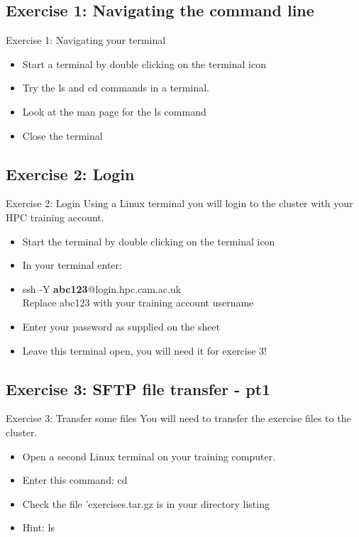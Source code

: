 \subsection{Exercise 1: Navigating the command line}
\begin{frame}{Exercise 1: Navigating your terminal}
\begin{itemize}
\item{Start a terminal by double clicking on the terminal icon}
\item{Try the \alert{\footnotesize ls } and \alert{\footnotesize cd } commands in a terminal.}
\item{Look at the man page for the ls command}
\item{Close the terminal}
\end{itemize}
\end{frame}

\subsection{Exercise 2: Login}
\begin{frame}{Exercise 2: Login}
Using a Linux terminal you will login to the cluster with your HPC training account.
\begin{itemize}
\item{Start the terminal by double clicking on the terminal icon}
\item In your terminal enter:
\item{ssh -Y \textbf{abc123}@login.hpc.cam.ac.uk}\\
Replace abc123 with your training account username 
\item {Enter your password as supplied on the sheet}
\item{Leave this terminal open, you will need it for exercise 3!}
\end{itemize}
\end{frame}

\subsection{Exercise 3: SFTP file transfer - pt1}
\begin{frame}{Exercise 3: Transfer some files}
You will need to transfer the exercise files to the cluster.
\begin{itemize}
\item{Open a second Linux terminal on your training computer.}
\item{Enter this command: cd \alert{\footnotesize {}}}
\item{Check the file 'exercises.tar.gz is in your directory listing}
\item{Hint: ls}
\end{itemize}
\end{frame}

